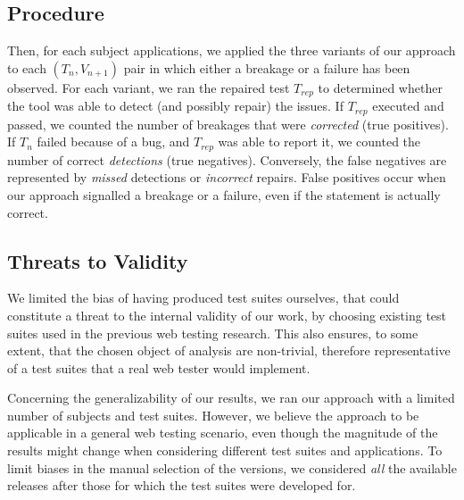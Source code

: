 \subsection{Procedure}\label{sec:procedure}

Then, for each subject applications, we applied the three variants of our approach to each $(T_n,V_{n+1})$ pair in which either a breakage or a failure has been observed. For each variant, we ran the repaired test $T_{rep}$ to determined whether the tool was able to detect (and possibly repair) the issues. If $T_{rep}$ executed and passed, we counted the number of breakages that were \textit{corrected} (true positives). If $T_n$ failed because of a bug, and $T_{rep}$ was able to report it, we counted the number of correct \textit{detections} (true negatives). Conversely, the false negatives are represented by \textit{missed} detections or \textit{incorrect} repairs. False positives occur when our approach signalled a breakage or a failure, even if the statement is actually correct.


\subsection{Threats to Validity}\label{sec:ttv}

 We limited the bias of having produced test suites ourselves, that could constitute a threat to the internal validity of our work, by choosing existing test suites used in the previous web testing research. This also ensures, to some extent, that the chosen object of analysis are non-trivial, therefore representative of a test suites that a real web tester would implement. 

 Concerning the generalizability of our results, we ran our approach with a limited number of subjects and test suites. However, we believe the approach to be applicable in a general web testing scenario, even though the magnitude of the results might change when considering different test suites and applications. To limit biases in the manual selection of the versions, we considered \textit{all} the available releases after those for which the test suites were developed for.
 

